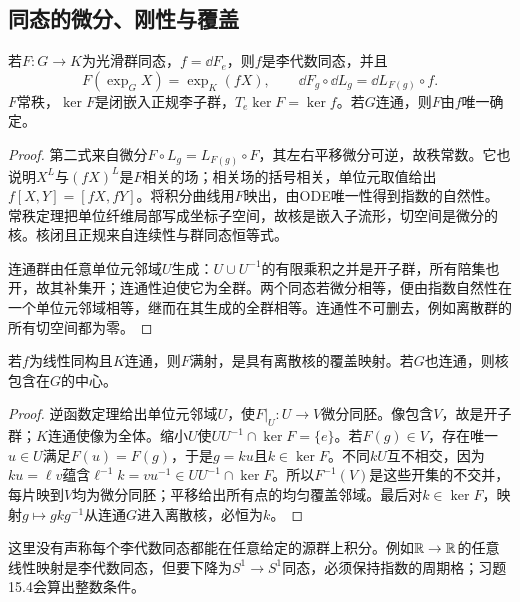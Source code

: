 \subsection{同态的微分、刚性与覆盖}
\begin{theorem}\label{thm:lie-homomorphism}
若$F:G\to K$为光滑群同态，$f=\dd F_e$，则$f$是李代数同态，并且
\[
 F(\exp_G X)=\exp_K(fX),\qquad
 \dd F_g\circ\dd L_g=\dd L_{F(g)}\circ f.
\]
$F$常秩，$\ker F$是闭嵌入正规李子群，$T_e\ker F=\ker f$。若$G$连通，则$F$由$f$唯一确定。
\end{theorem}
\begin{proof}
第二式来自微分$F\circ L_g=L_{F(g)}\circ F$，其左右平移微分可逆，故秩常数。它也说明$X^L$与$(fX)^L$是$F$相关的场；相关场的括号相关，单位元取值给出$f[X,Y]=[fX,fY]$。将积分曲线用$F$映出，由ODE唯一性得到指数的自然性。常秩定理把单位纤维局部写成坐标子空间，故核是嵌入子流形，切空间是微分的核。核闭且正规来自连续性与群同态恒等式。

连通群由任意单位元邻域$U$生成：$U\cup U^{-1}$的有限乘积之并是开子群，所有陪集也开，故其补集开；连通性迫使它为全群。两个同态若微分相等，便由指数自然性在一个单位元邻域相等，继而在其生成的全群相等。连通性不可删去，例如离散群的所有切空间都为零。
\end{proof}

\begin{proposition}\label{prop:lie-covering}
若$f$为线性同构且$K$连通，则$F$满射，是具有离散核的覆盖映射。若$G$也连通，则核包含在$G$的中心。
\end{proposition}
\begin{proof}
逆函数定理给出单位元邻域$U$，使$F|_U:U\to V$微分同胚。像包含$V$，故是开子群；$K$连通使像为全体。缩小$U$使$UU^{-1}\cap\ker F=\{e\}$。若$F(g)\in V$，存在唯一$u\in U$满足$F(u)=F(g)$，于是$g=ku$且$k\in\ker F$。不同$kU$互不相交，因为$ku=\ell v$蕴含$\ell^{-1}k=vu^{-1}\in UU^{-1}\cap\ker F$。所以$F^{-1}(V)$是这些开集的不交并，每片映到$V$均为微分同胚；平移给出所有点的均匀覆盖邻域。最后对$k\in\ker F$，映射$g\mapsto gkg^{-1}$从连通$G$进入离散核，必恒为$k$。
\end{proof}

这里没有声称每个李代数同态都能在任意给定的源群上积分。例如$\mathbb{R}\to\mathbb{R}$的任意线性映射是李代数同态，但要下降为$S^1\to S^1$同态，必须保持指数的周期格；习题15.4会算出整数条件。

